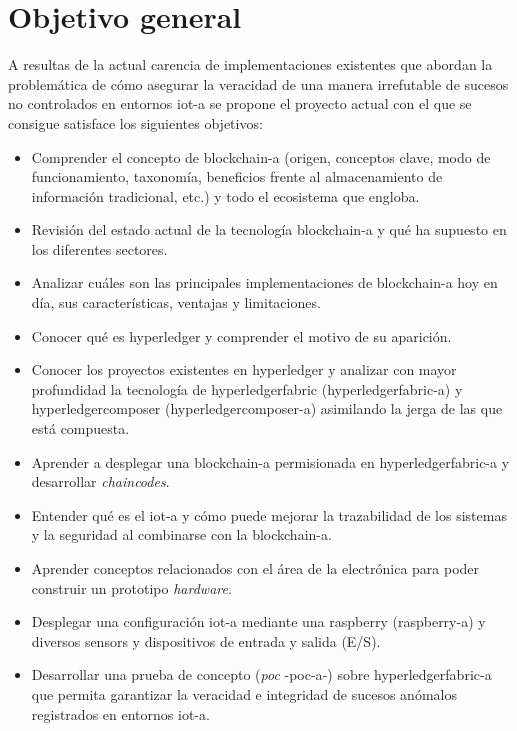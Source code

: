 \documentclass[12pt,a4paper, twoside]{report}
\begin{document}
	\section{Objetivo general}

	A resultas de la actual carencia de implementaciones existentes que abordan la problemática de cómo asegurar la veracidad de una manera irrefutable de sucesos no controlados en entornos \gls{iot-a} se propone el proyecto actual con el que se consigue satisface los siguientes objetivos:
		
	\begin{itemize}
		\item Comprender el concepto de \gls{blockchain-a} (origen, conceptos clave, modo de funcionamiento, taxonomía, beneficios frente al almacenamiento de información tradicional, etc.) y todo el ecosistema que engloba. 
		\item Revisión del estado actual de la tecnología \gls{blockchain-a} y qué ha supuesto en los diferentes sectores.
		\item Analizar cuáles son las principales implementaciones de \gls{blockchain-a} hoy en día, sus características, ventajas y limitaciones.
		\item Conocer qué es \gls{hyperledger} y comprender el motivo de su aparición. 
		\item Conocer los proyectos existentes en \gls{hyperledger} y analizar con mayor profundidad la tecnología de \gls{hyperledgerfabric} (\gls{hyperledgerfabric-a}) y \gls{hyperledgercomposer} (\gls{hyperledgercomposer-a}) \cite{hyperledgercomposer:url} asimilando la jerga de las que está compuesta. 
		\item Aprender a desplegar una \gls{blockchain-a} permisionada en \gls{hyperledgerfabric-a} y desarrollar \textit{\glspl{chaincode}}.
		\item Entender qué es el \gls{iot-a} y cómo puede mejorar la trazabilidad de los sistemas y la seguridad al combinarse con la \gls{blockchain-a}.
		\item Aprender conceptos relacionados con el área de la electrónica para poder construir un \gls{prototipo} \textit{hardware}.
		\item Desplegar una configuración \gls{iot-a} mediante una \gls{raspberry} (\gls{raspberry-a}) y diversos \glspl{sensor} y dispositivos de entrada y salida (E/S).
		\item Desarrollar una prueba de concepto (\textit{\gls{poc}} -\gls{poc-a}-) sobre \gls{hyperledgerfabric-a} que permita garantizar la veracidad e integridad de sucesos anómalos registrados en entornos \gls{iot-a}.
	\end{itemize}
		
\end{document}

